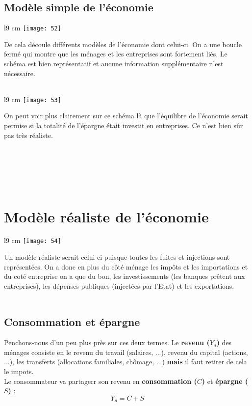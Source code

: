 \subsection{Modèle simple de l'économie}
\begin{wrapfigure}[7]{l}{9 cm}
	\texttt{[image: 52]}
\end{wrapfigure}
De cela découle différents modèles de l'économie dont celui-ci. On a une boucle fermé qui montre que les ménages et les entreprises sont fortement liés. Le schéma est bien représentatif et aucune information supplémentaire n'est nécessaire. \\\\

\begin{wrapfigure}[5]{l}{9 cm}
	\texttt{[image: 53]}
\end{wrapfigure}
On peut voir plus clairement sur ce schéma là que l'équilibre de l'économie serait permise si la totalité de l'épargne était investit en entreprises. Ce n'est bien sûr pas très réaliste.  \\\\\\\\\\\

\section{Modèle réaliste de l'économie}
\begin{wrapfigure}[9]{l}{9 cm}
	\texttt{[image: 54]}
\end{wrapfigure}
Un modèle réaliste serait celui-ci puisque toutes les fuites et injections sont représentées. On a donc en plus du côté ménage les impôts et les importations et du coté entreprise on a que du bon, les investissements (les banques prêtent aux entreprises), les dépenses publiques (injectées par l'Etat) et les exportations. \\\\

\subsection{Consommation et épargne}
Penchons-nous d'un peu plus près sur ces deux termes. Le \textbf{revenu ($Y_d$)} des ménages consiste en le revenu du travail (salaires, ...), revenu du capital (actions, ...), les transferts (allocations familiales, chômage, ...) \textbf{mais} il faut retirer de cela le impots. \\
Le consommateur va partagerr son revenu en \textbf{consommation ($C$)} et \textbf{épargne ($S$)} : 
\begin{equation}
	Y_d = C + S
\end{equation}


